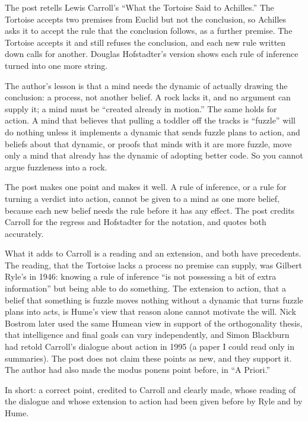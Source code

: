 \begin{afterword}
\summaryhead

The post retells Lewis Carroll's ``What the Tortoise Said to Achilles.'' The Tortoise accepts two premises from Euclid but not the conclusion, so Achilles asks it to accept the rule that the conclusion follows, as a further premise. The Tortoise accepts it and still refuses the conclusion, and each new rule written down calls for another. Douglas Hofstadter's version shows each rule of inference turned into one more string.

The author's lesson is that a mind needs the dynamic of actually drawing the conclusion: a process, not another belief. A rock lacks it, and no argument can supply it; a mind must be ``created already in motion.'' The same holds for action. A mind that believes that pulling a toddler off the tracks is ``fuzzle'' will do nothing unless it implements a dynamic that sends fuzzle plans to action, and beliefs about that dynamic, or proofs that minds with it are more fuzzle, move only a mind that already has the dynamic of adopting better code. So you cannot argue fuzzleness into a rock.

\responsehead

The post makes one point and makes it well. A rule of inference, or a rule for turning a verdict into action, cannot be given to a mind as one more belief, because each new belief needs the rule before it has any effect. The post credits Carroll for the regress and Hofstadter for the notation, and quotes both accurately.

What it adds to Carroll is a reading and an extension, and both have precedents. The reading, that the Tortoise lacks a process no premise can supply, was Gilbert Ryle's in 1946: knowing a rule of inference ``is not possessing a bit of extra information'' but being able to do something. The extension to action, that a belief that something is fuzzle moves nothing without a dynamic that turns fuzzle plans into acts, is Hume's view that reason alone cannot motivate the will. Nick Bostrom later used the same Humean view in support of the orthogonality thesis, that intelligence and final goals can vary independently, and Simon Blackburn had retold Carroll's dialogue about action in 1995 (a paper I could read only in summaries). The post does not claim these points as new, and they support it. The author had also made the modus ponens point before, in ``A Priori.''

In short: a correct point, credited to Carroll and clearly made, whose reading of the dialogue and whose extension to action had been given before by Ryle and by Hume.
\end{afterword}
